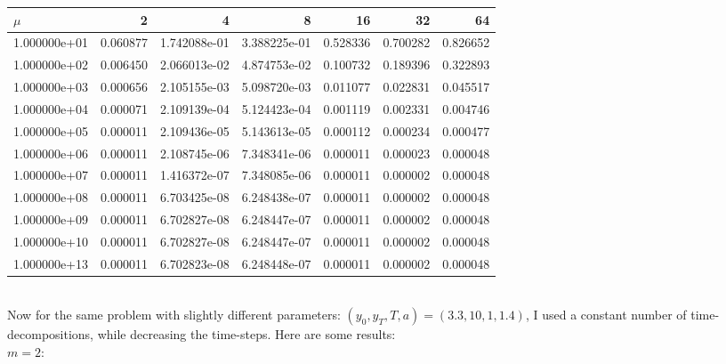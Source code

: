 \documentclass[11pt,a4paper]{report}
\begin{document}
\begin{tabular}{lrrrrrr}
\toprule
{} $\mu$&        2  &            4  &            8  &        16 &        32 &        64 \\
\midrule
1.000000e+01 &  0.060877 &  1.742088e-01 &  3.388225e-01 &  0.528336 &  0.700282 &  0.826652 \\
1.000000e+02 &  0.006450 &  2.066013e-02 &  4.874753e-02 &  0.100732 &  0.189396 &  0.322893 \\
1.000000e+03 &  0.000656 &  2.105155e-03 &  5.098720e-03 &  0.011077 &  0.022831 &  0.045517 \\
1.000000e+04 &  0.000071 &  2.109139e-04 &  5.124423e-04 &  0.001119 &  0.002331 &  0.004746 \\
1.000000e+05 &  0.000011 &  2.109436e-05 &  5.143613e-05 &  0.000112 &  0.000234 &  0.000477 \\
1.000000e+06 &  0.000011 &  2.108745e-06 &  7.348341e-06 &  0.000011 &  0.000023 &  0.000048 \\
1.000000e+07 &  0.000011 &  1.416372e-07 &  7.348085e-06 &  0.000011 &  0.000002 &  0.000048 \\
1.000000e+08 &  0.000011 &  6.703425e-08 &  6.248438e-07 &  0.000011 &  0.000002 &  0.000048 \\
1.000000e+09 &  0.000011 &  6.702827e-08 &  6.248447e-07 &  0.000011 &  0.000002 &  0.000048 \\
1.000000e+10 &  0.000011 &  6.702827e-08 &  6.248447e-07 &  0.000011 &  0.000002 &  0.000048 \\
1.000000e+13 &  0.000011 &  6.702823e-08 &  6.248448e-07 &  0.000011 &  0.000002 &  0.000048 \\
\bottomrule
\end{tabular}
\\
Now for the same problem with slightly different parameters: $(y_0,y_T,T,a)=(3.3,10,1,1.4)$, I used a constant number of time-decompositions, while decreasing the time-steps. Here are some results:
\\
$m=2$:
\\
\end{document}
